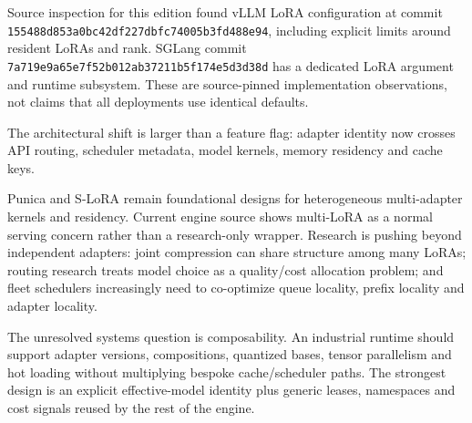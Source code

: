 Source inspection for this edition found vLLM LoRA configuration at commit
\texttt{155488d853a0bc42df227dbfc74005b3fd488e94}, including explicit limits around
resident LoRAs and rank. SGLang commit
\texttt{7a719e9a65e7f52b012ab37211b5f174e5d3d38d} has a dedicated LoRA argument and
runtime subsystem. These are source-pinned implementation observations, not claims that
all deployments use identical defaults.

The architectural shift is larger than a feature flag: adapter identity now crosses
API routing, scheduler metadata, model kernels, memory residency and cache keys.


Punica and S-LoRA remain foundational designs for heterogeneous multi-adapter kernels
and residency. Current engine source shows multi-LoRA as a normal serving concern
rather than a research-only wrapper. Research is pushing beyond independent adapters:
joint compression can share structure among many LoRAs; routing research treats model
choice as a quality/cost allocation problem; and fleet schedulers increasingly need to
co-optimize queue locality, prefix locality and adapter locality.

The unresolved systems question is composability. An industrial runtime should support
adapter versions, compositions, quantized bases, tensor parallelism and hot loading
without multiplying bespoke cache/scheduler paths. The strongest design is an explicit
effective-model identity plus generic leases, namespaces and cost signals reused by
the rest of the engine.

